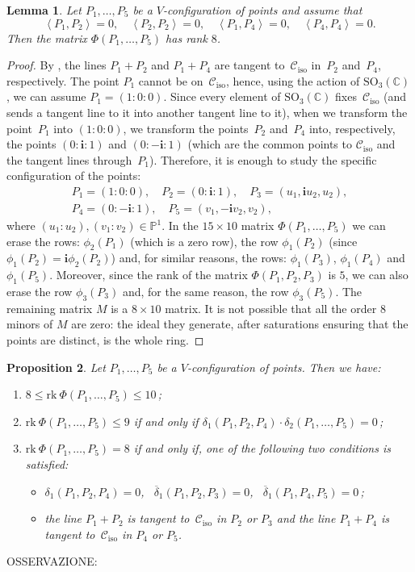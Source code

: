 \documentclass[11pt, a4paper, reqno, captions=tableheading,bibliography=totoc]{scrartcl}
\theoremstyle{plain}
\newtheorem{lemma}{Lemma}[section]
\newtheorem{prop}[lemma]{Proposition}
\theoremstyle{definition}
\newcommand{\p}{\mathbb{P}}
\newcommand{\iso}{\mathcal{C}_{\mathrm{iso}}}
\newcommand{\scl}[2]{\left\langle {#1}, {#2} \right\rangle}
\newcommand{\iii}{\textbf{i}}
\newcommand{\rk}{\ensuremath{\mathrm{rk}}}
\begin{document}
\begin{lemma}
\label{lemma:special_case_rank_8}
Let $P_1, \dots, P_5$ be a $V$-configuration of points and assume that
\[
\scl{P_1}{P_2}=0, \quad \scl{P_2}{P_2}=0, \quad \scl{P_1}{P_4}=0,
\quad \scl{P_4}{P_4}=0.
\]
Then the matrix $\Phi(P_1, \dots, P_5)$ has rank $8$.
\end{lemma}
\begin{proof}
By ,
the lines $P_1+P_2$ and $P_1+P_4$ are tangent to~$\iso$ in~$P_2$ and~$P_4$, respectively. The point $P_1$ cannot be on~$\iso$, hence, using the
action of $\mathrm{SO}_3(\mathbb{C})$, we can assume $P_1 = (1: 0: 0)$.
Since every element of $\mathrm{SO}_3(\mathbb{C})$ fixes~$\iso$ (and sends a tangent line to it into another tangent line to it), when we transform the point~$P_1$
into $(1: 0: 0)$, we transform the points~$P_2$ and~$P_4$ into, respectively,
the points $(0: \iii: 1)$ and $(0: -\iii: 1)$ (which are the common points to
$\iso$ and the tangent lines through~$P_1$).
Therefore, it is enough to study the
specific configuration of the points:
%
\begin{gather*}
P_1 = (1: 0: 0), \quad P_2=(0: \iii: 1), \quad P_3=(u_1, \iii u_2, u_2), \\
P_4 = (0: -\iii: 1), \quad P_5 = (v_1, -\iii v_2, v_2),
\end{gather*}
%
where $(u_1: u_2), (v_1: v_2) \in \p^1$.
In the $15\times 10$ matrix $\Phi(P_1, \dots, P_5)$ we can erase the
rows: $\phi_2(P_1)$ (which is a zero row), the row $\phi_1(P_2)$
(since $\phi_1(P_2)=\iii\phi_2(P_2)$) and, for similar reasons, the
rows: $\phi_1(P_3)$, $\phi_1(P_4)$ and $\phi_1(P_5)$.
Moreover, since the rank of the matrix $\Phi(P_1, P_2, P_3)$ is $5$,
we can also erase the row $\phi_3(P_3)$ and, for the same reason, the
row $\phi_3(P_5)$. The remaining matrix $M$ is a $8\times 10$ matrix.
It is not possible that all the order $8$ minors
of $M$ are zero: the ideal they generate, after saturations ensuring
that the points are distinct, is the whole ring.
\end{proof}

\begin{prop}
\label{proposition:rank_V}
Let $P_1, \dots, P_5$ be a $V$-configuration of
points. Then we have:
\begin{enumerate}
\item $8 \leq \rk \ \Phi(P_1, \dots, P_5) \leq 10$\,;
\item $\rk \ \Phi(P_1, \dots, P_5) \leq 9$ if and only if
$\delta_1(P_1, P_2, P_4) \cdot \delta_2(P_1, \dots, P_5) =0$\,;
\item $\rk \ \Phi(P_1, \dots, P_5) = 8$ if and only if, one of
the following two conditions is satisfied:
%
\begin{itemize}
\item $\delta_1(P_1, P_2, P_4) = 0$, \
$\overline{\delta}_1(P_1, P_2, P_3) = 0$,
\ $\overline{\delta}_1(P_1, P_4, P_5) = 0$\,;
  \item the line $P_1+P_2$ is tangent to~$\iso$ in $P_2$ or $P_3$
and the line $P_1+P_4$ is tangent to~$\iso$ in $P_4$ or $P_5$.
\end{itemize}
%
\end{enumerate}
\end{prop}
OSSERVAZIONE:
\end{document}
